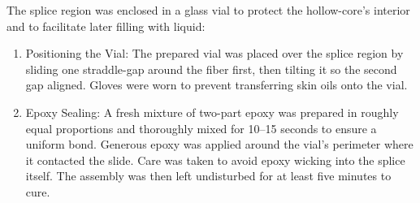 The splice region was enclosed in a glass vial to protect the hollow-core’s interior and to facilitate later filling with liquid:

\begin{enumerate}
	\item Positioning the Vial: The prepared vial was placed over the splice region by sliding one straddle-gap around the fiber first, then tilting it so the second gap aligned. Gloves were worn to prevent transferring skin oils onto the vial.
	\item Epoxy Sealing: A fresh mixture of two-part epoxy was prepared in roughly equal proportions and thoroughly mixed for 10–15 seconds to ensure a uniform bond. Generous epoxy was applied around the vial’s perimeter where it contacted the slide. Care was taken to avoid epoxy wicking into the splice itself. The assembly was then left undisturbed for at least five minutes to cure.
\end{enumerate}

